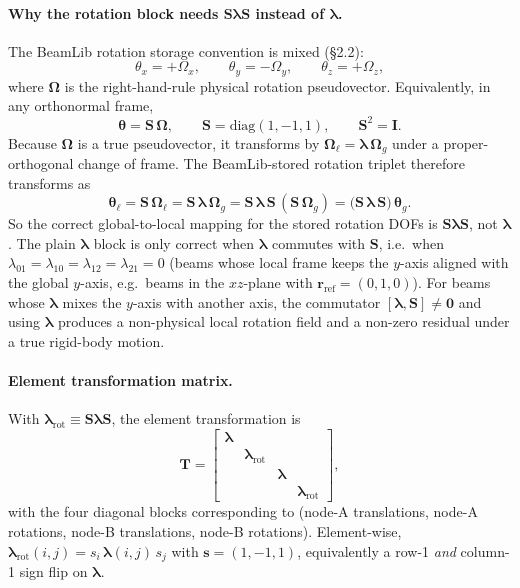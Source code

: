 \documentclass[11pt,a4paper]{article}
\newcommand{\bmath}[1]{\boldsymbol{#1}}
\begin{document}
\paragraph{Why the rotation block needs $\bmath{S}\bmath{\lambda}\bmath{S}$ instead of $\bmath{\lambda}$.}\label{sec:slambdaSlambdaS}
The BeamLib rotation storage convention is mixed (\S2.2):
\[
\theta_x = +\Omega_x, \qquad \theta_y = -\Omega_y, \qquad \theta_z = +\Omega_z,
\]
where $\bmath{\Omega}$ is the right-hand-rule physical rotation pseudovector. Equivalently, in any orthonormal frame,
\[
\bmath{\theta} = \bmath{S}\,\bmath{\Omega}, \qquad \bmath{S} = \mathrm{diag}(1,-1,1), \qquad \bmath{S}^2 = \bmath{I}.
\]
Because $\bmath{\Omega}$ is a true pseudovector, it transforms by $\bmath{\Omega}_\ell = \bmath{\lambda}\,\bmath{\Omega}_g$ under a proper-orthogonal change of frame. The BeamLib-stored rotation triplet therefore transforms as
\[
\bmath{\theta}_\ell = \bmath{S}\,\bmath{\Omega}_\ell = \bmath{S}\,\bmath{\lambda}\,\bmath{\Omega}_g = \bmath{S}\,\bmath{\lambda}\,\bmath{S}\,(\bmath{S}\,\bmath{\Omega}_g) = \bigl(\bmath{S}\,\bmath{\lambda}\,\bmath{S}\bigr)\,\bmath{\theta}_g.
\]
So the correct global-to-local mapping for the stored rotation DOFs is $\bmath{S}\bmath{\lambda}\bmath{S}$, not $\bmath{\lambda}$. The plain $\bmath{\lambda}$ block is only correct when $\bmath{\lambda}$ commutes with $\bmath{S}$, i.e.\ when $\lambda_{01}=\lambda_{10}=\lambda_{12}=\lambda_{21}=0$ (beams whose local frame keeps the $y$-axis aligned with the global $y$-axis, e.g.\ beams in the $xz$-plane with $\bmath{r}_{\text{ref}}=(0,1,0)$). For beams whose $\bmath{\lambda}$ mixes the $y$-axis with another axis, the commutator $[\bmath{\lambda},\bmath{S}]\ne\bmath{0}$ and using $\bmath{\lambda}$ produces a non-physical local rotation field and a non-zero residual under a true rigid-body motion.

\paragraph{Element transformation matrix.}
With $\bmath{\lambda}_{\text{rot}} \equiv \bmath{S}\bmath{\lambda}\bmath{S}$, the element transformation is
\[
\bmath{T} = \begin{bmatrix}
\bmath{\lambda} & & & \\
& \bmath{\lambda}_{\text{rot}} & & \\
& & \bmath{\lambda} & \\
& & & \bmath{\lambda}_{\text{rot}}
\end{bmatrix},
\]
with the four diagonal blocks corresponding to (node-A translations, node-A rotations, node-B translations, node-B rotations). Element-wise, $\bmath{\lambda}_{\text{rot}}(i,j) = s_i\,\bmath{\lambda}(i,j)\,s_j$ with $\bmath{s} = (1,-1,1)$, equivalently a row-1 \emph{and} column-1 sign flip on $\bmath{\lambda}$.
\end{document}

